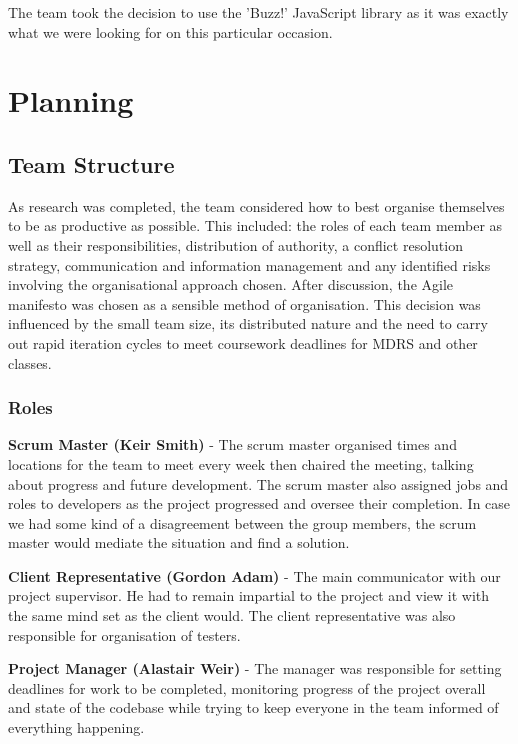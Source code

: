 \documentclass{l3proj}
\begin{document}
The team took the decision to use the 'Buzz!' JavaScript library as it was exactly what we were looking for on this particular occasion.

\chapter{Planning}
\label{Planning}

\section{Team Structure}		As research was completed, the team considered how to best organise themselves to be as productive as possible. This included: the roles of each team member as well as their responsibilities, distribution of authority, a conflict resolution strategy, communication and information management and any identified risks involving the organisational approach chosen. After discussion, the Agile manifesto was chosen as a sensible method of organisation. This decision was influenced by the small team size, its distributed nature and the need to carry out rapid iteration cycles to meet coursework deadlines for MDRS and other classes.

\subsection{Roles}
{\bf Scrum Master (Keir Smith)} - The scrum master organised times and locations for the team to meet every week then chaired the meeting, talking about progress and future development. The scrum master also assigned jobs and roles to developers as the project progressed and oversee their completion. In case we had some kind of a disagreement between the group members, the scrum master would mediate the situation and find a solution.

{\bf Client Representative (Gordon Adam)} - The main communicator with our project supervisor. He had to remain impartial to the project and view it with the same mind set as the client would. The client representative was also responsible for organisation of testers.

{\bf Project Manager (Alastair Weir)} - The manager was responsible for setting deadlines for work to be completed, monitoring progress of the project overall and state of the codebase while trying to keep everyone in the team informed of everything happening.
\end{document}
